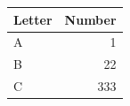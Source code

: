 \begin{tabular}{lr}
\toprule
Letter & Number \\
\midrule
A & 1 \\
B & 22 \\
C & 333 \\
\bottomrule
\end{tabular}


